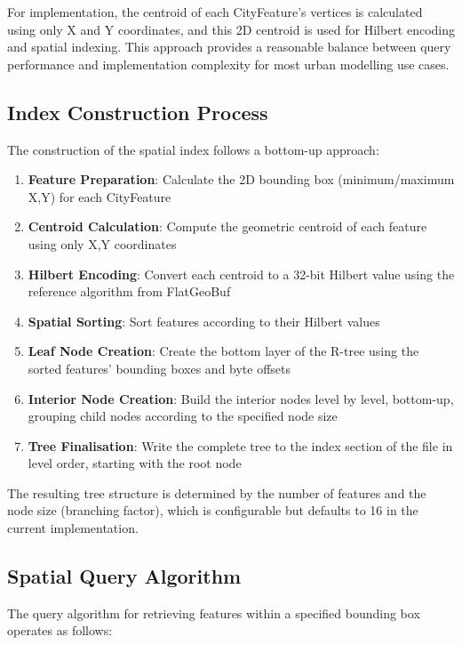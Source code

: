 For implementation, the centroid of each CityFeature's vertices is calculated using only X and Y coordinates, and this 2D centroid is used for Hilbert encoding and spatial indexing. This approach provides a reasonable balance between query performance and implementation complexity for most urban modelling use cases.

\subsection{Index Construction Process}
\label{methodology:spatial_index:index_construction}

The construction of the spatial index follows a bottom-up approach:

\begin{enumerate}
    \item \textbf{Feature Preparation}: Calculate the 2D bounding box (minimum/maximum X,Y) for each CityFeature
    \item \textbf{Centroid Calculation}: Compute the geometric centroid of each feature using only X,Y coordinates
    \item \textbf{Hilbert Encoding}: Convert each centroid to a 32-bit Hilbert value using the reference algorithm from FlatGeoBuf
    \item \textbf{Spatial Sorting}: Sort features according to their Hilbert values
    \item \textbf{Leaf Node Creation}: Create the bottom layer of the R-tree using the sorted features' bounding boxes and byte offsets
    \item \textbf{Interior Node Creation}: Build the interior nodes level by level, bottom-up, grouping child nodes according to the specified node size
    \item \textbf{Tree Finalisation}: Write the complete tree to the index section of the file in level order, starting with the root node
\end{enumerate}

The resulting tree structure is determined by the number of features and the node size (branching factor), which is configurable but defaults to 16 in the current implementation.

\subsection{Spatial Query Algorithm}
\label{methodology:spatial_index:spatial_query_algorithm}

The query algorithm for retrieving features within a specified bounding box operates as follows:

